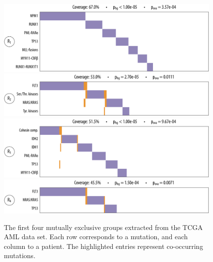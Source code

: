 \begin{figure}[htbp]
\centering
\includegraphics[width=\textwidth]{figures/genes/aml_1.pdf}\\[2em]
\includegraphics[width=\textwidth]{figures/genes/aml_2.pdf}\\[2em]
\includegraphics[width=\textwidth]{figures/genes/aml_3.pdf}\\[2em]
\includegraphics[width=\textwidth]{figures/genes/aml_4.pdf}\\[2em]
\caption{The first four mutually exclusive groups extracted from the TCGA AML data set.
Each row corresponds to a mutation, and each column to a patient.
The highlighted entries represent co-occurring mutations.}
\label{fig:rep_aml_1}
\end{figure}

